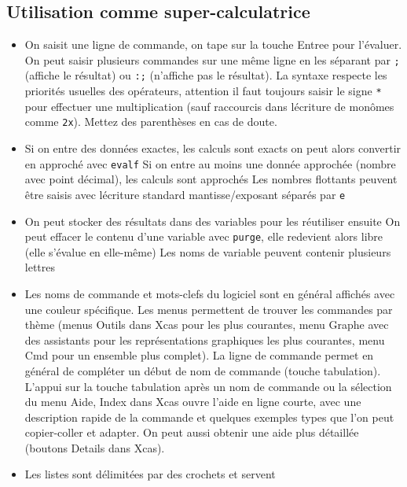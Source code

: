 \documentclass[a4paper,11pt]{book}
\begin{document}
\begin{giacjshere}
\section{Utilisation comme super-calculatrice}
\begin{itemize}
\item 
On saisit une ligne de commande, on tape sur la touche Entree pour
l'\'evaluer. On peut saisir plusieurs commandes sur une m\^eme ligne
en les s\'eparant par \verb|;| (affiche le r\'esultat) ou
\verb|:;| (n'affiche pas le r\'esultat).
La syntaxe respecte les priorit\'es usuelles des 
op\'erateurs, attention il faut toujours saisir le signe \verb|*|
pour effectuer une multiplication (sauf raccourcis dans l\'ecriture
de mon\^omes comme \verb|2x|). Mettez des parenth\`eses en cas de doute.
\item 
Si on entre des donn\'ees exactes, les calculs sont exacts
on peut alors convertir en approch\'e avec \verb|evalf|
Si on entre au moins une donn\'ee approch\'ee (nombre avec point
d\'ecimal), les calculs sont approch\'es
Les nombres flottants peuvent \^etre saisis avec l\'ecriture standard
mantisse/exposant s\'epar\'es par \verb|e|
\item On peut stocker des r\'esultats dans des variables
pour les r\'eutiliser ensuite
On peut effacer le contenu d'une variable avec \verb|purge|, elle
redevient alors libre (elle s'\'evalue en elle-m\^eme)
Les noms de variable peuvent contenir plusieurs lettres
\item Les noms de commande et mots-clefs du logiciel sont en g\'en\'eral
affich\'es avec une couleur sp\'ecifique. Les menus permettent
de trouver les commandes par th\`eme (menus Outils dans Xcas pour
les plus courantes, menu Graphe avec des assistants pour les 
repr\'esentations graphiques les plus courantes, 
menu Cmd pour un ensemble plus
complet). La ligne de commande permet
en g\'en\'eral de compl\'eter un d\'ebut de nom de commande (touche
tabulation). L'appui sur la touche tabulation apr\`es
un nom de commande ou la s\'election du menu Aide, Index dans
Xcas ouvre l'aide en ligne
courte, avec une description rapide de la commande et
quelques exemples types que l'on peut copier-coller et adapter.
On peut aussi obtenir une aide plus d\'etaill\'ee (boutons Details
dans Xcas).
\item Les listes sont d\'elimit\'ees par des crochets et servent

\end{itemize}
\end{giacjshere}
\end{document}
